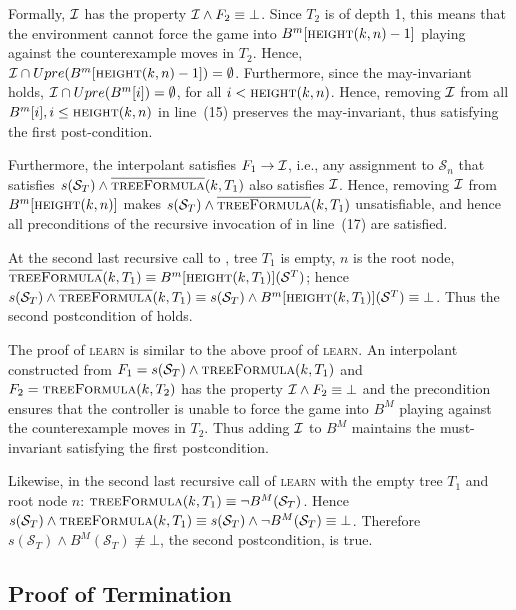 Formally, $\mathcal{I}$ has the property $\mathcal{I} \land F_2 \equiv \bot$.  Since $T_2$ is
of depth 1, this means that the environment cannot force the game into
$B^m[\textsc{height}(k, n)-1]$ playing against the counterexample moves in $T_2$.
Hence, $\mathcal{I} \cap Upre(B^m[\textsc{height}(k, n)-1]) = \emptyset$.  Furthermore,
since the may-invariant holds, $\mathcal{I} \cap Upre(B^m[i]) =
\emptyset$, for all $i < \textsc{height}(k, n)$.  Hence, removing $\mathcal{I}$ from all
$B^m[i], i\leq \textsc{height}(k, n)$ in line~(15) preserves the may-invariant,
thus satisfying the first post-condition.

Furthermore, the interpolant satisfies $F_1 \rightarrow \mathcal{I}$, i.e., any
assignment to $\mathcal{S}_n$ that satisfies $s(\mathcal{S}_T) \land
\textsc{$\overline{\mbox{treeFormula}}$}(k, T_1)$ also satisfies $\mathcal{I}$.  Hence,
removing $\mathcal{I}$ from $B^m[\textsc{height}(k, n)]$ makes $s(\mathcal{S}_T) \land
\textsc{$\overline{\mbox{treeFormula}}$}(k, T_1)$ unsatisfiable, and hence all
preconditions of the recursive invocation of \textsc{} in
line~(17) are satisfied.  

At the second last recursive call to \textsc{}, tree $T_1$
is empty, $n$ is the root node, $\textsc{$\overline{\mbox{treeFormula}}$}(k, T_1)
\equiv B^m[\textsc{height}(k, T_1)](\mathcal{S}^T)$; hence $s(\mathcal{S}_T) \land
\textsc{$\overline{\mbox{treeFormula}}$}(k, T_1) \equiv s(\mathcal{S}_T) \land
B^m[\textsc{height}(k, T_1)](\mathcal{S}^T) \equiv \bot$.  Thus the second postcondition of
\textsc{} holds.

The proof of \textsc{learn} is similar to the above proof of \textsc{learn}. An
interpolant constructed from $F_1=s(\mathcal{S}_T) \land \textsc{treeFormula}(k, T_1)$
and $F_2 = \textsc{treeFormula}(k, T_2)$ has the property $\mathcal{I} \land F_2 \equiv
\bot$ and the precondition ensures that the controller is unable to force the
game into $B^M$ playing against the counterexample moves in $T_2$. Thus adding
$\mathcal{I}$ to $B^M$ maintains the must-invariant satisfying the first postcondition.

Likewise, in the second last recursive call of \textsc{learn} with the empty
tree $T_1$ and root node $n$: $\textsc{treeFormula}(k, T_1) \equiv \lnot
B^M(\mathcal{S}_T)$.  Hence $s(\mathcal{S}_T) \land \textsc{treeFormula}(k, T_1) \equiv
s(\mathcal{S}_T) \land \lnot B^M(\mathcal{S}_T) \equiv \bot$. Therefore $s(\mathcal{S}_T) \land
B^M(\mathcal{S}_T) \not\equiv \bot$, the second postcondition, is true.

\subsection{Proof of Termination}

